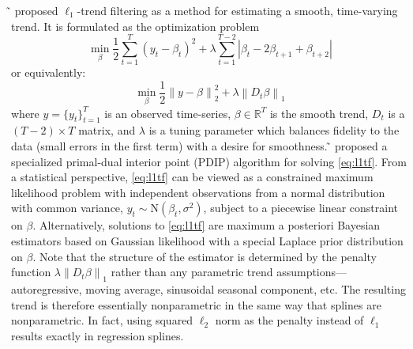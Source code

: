 \documentclass[letterpaper]{article} %
\newcommand{\citet}[1]
{\citeauthor{#1} ̃\shortcite{#1}}
\newcommand{\norm}[1]{\left\lVert #1 \right\rVert}
\begin{document}
\citet{KimKoh2009} proposed $\ell_1$-trend filtering as a
method for estimating a smooth, time-varying trend. It is formulated
as the optimization problem 
$$
\min_{\beta} \frac{1}{2} \sum_{t=1}^{T} (y_t-\beta_t)^2+\lambda
\sum_{t=1}^{T-2} \left|\beta_t-2\beta_{t+1}+\beta_{t+2}\right| 
$$
or equivalently:
\begin{equation}
\min_{\beta} \frac{1}{2} \norm{ y-\beta }_2^2+\lambda \norm{ D_t \beta}_1
\label{eq:l1tf}
\end{equation}
 where $y=\{y_t\}_{t=1}^T$ is an observed time-series, $\beta\in \mathbb{R}^T$ is the smooth trend,
 $D_t$ is a $(T-2)\times T$ matrix, and $\lambda$ is a tuning parameter
 which balances fidelity to the data (small errors in the first term)
 with a desire for smoothness.  
\citet{KimKoh2009} proposed a specialized primal-dual
interior point (PDIP) algorithm for solving \eqref{eq:l1tf}. From a
statistical perspective, \eqref{eq:l1tf} can be viewed as a constrained maximum
likelihood problem with independent observations from a normal
distribution with common variance, $y_t \sim \mbox{N}(\beta_t,
\sigma^2)$, subject to a piecewise linear constraint on
$\beta$. Alternatively, solutions to \eqref{eq:l1tf} are %
maximum a posteriori Bayesian estimators based on Gaussian likelihood
with a special Laplace prior distribution on $\beta$. Note that the
structure of the estimator is determined by the penalty function
$\lambda\norm{D_t\beta}_1$ rather than any parametric trend
assumptions---autoregressive, moving average, sinusoidal seasonal
component, etc. The resulting trend is therefore essentially
nonparametric in the same way that splines are nonparametric. In fact,
using squared $\ell_2$ norm as the penalty instead of $\ell_1$ results exactly in
regression splines.
\end{document}
